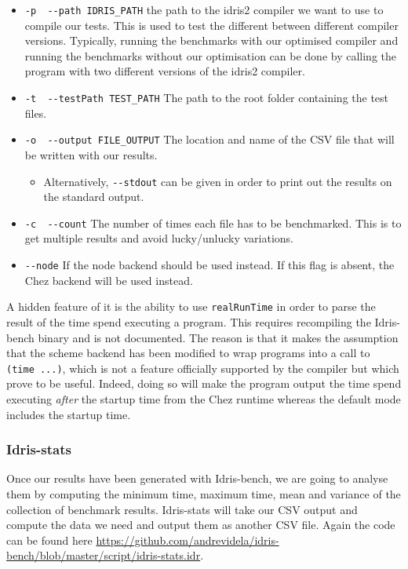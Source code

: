 \documentclass[
]{article}
\providecommand{\tightlist}{%
  \setlength{\itemsep}{0pt}\setlength{\parskip}{0pt}}
\begin{document}
\begin{itemize}
\tightlist
\item
  \texttt{-p\ \textbar{}\ -\/-path\ IDRIS\_PATH} the path to the idris2
  compiler we want to use to compile our tests. This is used to test the
  different between different compiler versions. Typically, running the
  benchmarks with our optimised compiler and running the benchmarks
  without our optimisation can be done by calling the program with two
  different versions of the idris2 compiler.
\item
  \texttt{-t\ \textbar{}\ -\/-testPath\ TEST\_PATH} The path to the root
  folder containing the test files.
\item
  \texttt{-o\ \textbar{}\ -\/-output\ FILE\_OUTPUT} The location and
  name of the CSV file that will be written with our results.

  \begin{itemize}
  \tightlist
  \item
    Alternatively, \texttt{-\/-stdout} can be given in order to print
    out the results on the standard output.
  \end{itemize}
\item
  \texttt{-c\ \textbar{}\ -\/-count} The number of times each file has
  to be benchmarked. This is to get multiple results and avoid
  lucky/unlucky variations.
\item
  \texttt{-\/-node} If the node backend should be used instead. If this
  flag is absent, the Chez backend will be used instead.
\end{itemize}

A hidden feature of it is the ability to use \texttt{realRunTime} in
order to parse the result of the time spend executing a program. This
requires recompiling the Idris-bench binary and is not documented. The
reason is that it makes the assumption that the scheme backend has been
modified to wrap programs into a call to \texttt{(time\ ...)}, which is
not a feature officially supported by the compiler but which prove to be
useful. Indeed, doing so will make the program output the time spend
executing \emph{after} the startup time from the Chez runtime whereas
the default mode includes the startup time.

\hypertarget{idris-stats}{%
\subsubsection{Idris-stats}\label{idris-stats}}

Once our results have been generated with Idris-bench, we are going to
analyse them by computing the minimum time, maximum time, mean and
variance of the collection of benchmark results. Idris-stats will take
our CSV output and compute the data we need and output them as another
CSV file. Again the code can be found here
\url{https://github.com/andrevidela/idris-bench/blob/master/script/idris-stats.idr}.
\end{document}
